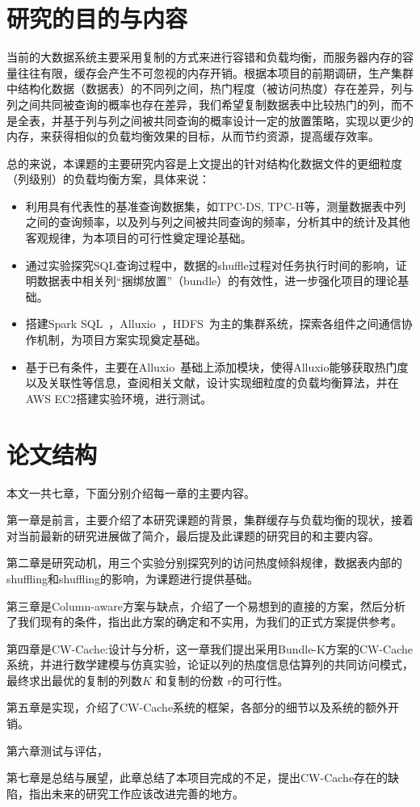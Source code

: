 \section{研究的目的与内容}
当前的大数据系统主要采用复制的方式来进行容错和负载均衡，而服务器内存的容量往往有限，缓存会产生不可忽视的内存开销。根据本项目的前期调研，生产集群中结构化数据（数据表）的不同列之间，热门程度（被访问热度）存在差异，列与列之间共同被查询的概率也存在差异，我们希望复制数据表中比较热门的列，而不是全表，并基于列与列之间被共同查询的概率设计一定的放置策略，实现以更少的内存，来获得相似的负载均衡效果的目标，从而节约资源，提高缓存效率。

总的来说，本课题的主要研究内容是上文提出的针对结构化数据文件的更细粒度（列级别）的负载均衡方案，具体来说：

\begin{itemize}
	\item 利用具有代表性的基准查询数据集，如TPC-DS, TPC-H等，测量数据表中列之间的查询频率，以及列与列之间被共同查询的频率，分析其中的统计及其他客观规律，为本项目的可行性奠定理论基础。
	\item 通过实验探究SQL查询过程中，数据的shuffle过程对任务执行时间的影响，证明数据表中相关列“捆绑放置”（bundle）的有效性，进一步强化项目的理论基础。
	\item 搭建Spark SQL~\cite{armbrust2015spark}，Alluxio~\cite{alluxio}，HDFS~\cite{shvachko2010hadoop}为主的集群系统，探索各组件之间通信协作机制，为项目方案实现奠定基础。
	\item 基于已有条件，主要在Alluxio~\cite{alluxio}基础上添加模块，使得Alluxio能够获取热门度以及关联性等信息，查阅相关文献，设计实现细粒度的负载均衡算法，并在AWS EC2搭建实验环境，进行测试。
\end{itemize}

\section{论文结构}

\par 本文一共七章，下面分别介绍每一章的主要内容。

\par 第一章是前言，主要介绍了本研究课题的背景，集群缓存与负载均衡的现状，接着对当前最新的研究进展做了简介，最后提及此课题的研究目的和主要内容。

\par 第二章是研究动机，用三个实验分别探究列的访问热度倾斜规律，数据表内部的shuffling和shuffling的影响，为课题进行提供基础。

\par 第三章是Column-aware方案与缺点，介绍了一个易想到的直接的方案，然后分析了我们现有的条件，指出此方案的确定和不实用，为我们的正式方案提供参考。

\par 第四章是CW-Cache:设计与分析，这一章我们提出采用Bundle-K方案的CW-Cache系统，并进行数学建模与仿真实验，论证以列的热度信息估算列的共同访问模式，最终求出最优的复制的列数$K$ 和复制的份数 $r$的可行性。

\par 第五章是实现，介绍了CW-Cache系统的框架，各部分的细节以及系统的额外开销。

\par 第六章测试与评估，

\par 第七章是总结与展望，此章总结了本项目完成的不足，提出CW-Cache存在的缺陷，指出未来的研究工作应该改进完善的地方。
